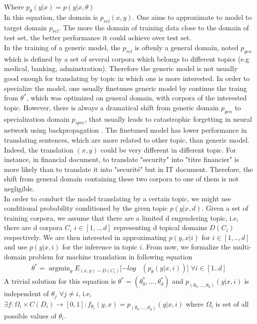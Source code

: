 \documentclass[11pt,a4paper]{article}
\DeclareMathOperator*{\argmin}{argmin}
\begin{document}
Where $p_{\theta}(y|x) = p(y|x,\theta)$ \\
In this equation, the domain is $p_{rel}(x,y)$. One aims to approximate to model to target domain $p_{rel}$. The more the domain of training data close to the domain of test set, the better performance it could achieve over test set.\\
In the training of a generic model, the $p_{rel}$ is oftenly a general domain, noted $p_{gen}$ which is defined by a set of several corpora which belongs to different topics (e.g medical, banking, adminstration). Therefore the generic model is not usually good enough for translating by topic in which one is more interested. In order to specialize the model, one usually finetunes generic model by continue the traing from $\theta^*$, which was optimized on general domain, with corpora of the interested topic. However, there is always a dramatical shift from generic domain $p_{gen}$ to specialization domain $p_{spec}$, that usually leads to catastrophic forgetting in neural network using backpropagation \cite{Michael1989Catastrophic}. The finetuned model has lower performance in translating sentences, which are more related to other topic, than generic model. Indeed, the translation $(x,y)$ could be very different in different topic. For instance, in financial document, to translate "security" into "titre financier" is more likely than to translate it into "securit\'e" but in IT document. Therefore, the shift from general domain containing these two corpora to one of them is not negligible. \\
In order to conduct the model translating by a certain topic, we might use conditional probability conditioned by the given topic $p(y|x,d)$. Given a set of training corpora, we assume that there are a limited d engendering topic, i.e, there are d corpora $C_i$ $i \in [1,..,d]$ representing d topical domains $D(C_i)$ respectively. We are then interested in approximating $p(y,x|i)$ for $i \in [1,..,d]$ and use $p(y|x,i)$ for the inference in topic $i$. From now, we formalize the multi-domain problem for machine translation in following equation
\begin{equation}
\begin{split}
\theta^* = \argmin_{\theta} E_{(x,y) \sim D(C_{i})} [-log & (p_{\theta}(y|x,i))] \; \forall i \in [1..d]
\end{split}
\end{equation}
A trivial solution for this equation is $\theta^* = (\theta^*_{0},...,\theta^*_{d})$ and $p_{(\theta_{0},...,\theta_d)}(y|x,i)$ is independent of $\theta_{j}$ $\forall j \neq i$, i.e, $\exists f:\Omega_i \times C(D_i) \rightarrow [0,1]: f_{\theta_i}(y,x) = p_{(\theta_{0},...,\theta_d)}(y|x,i)$ where $\Omega_i$ is set of all possible values of $\theta_i$. \\
\end{document}
